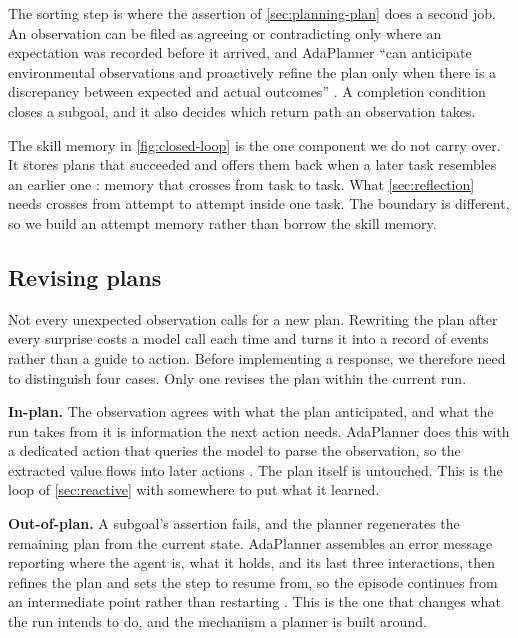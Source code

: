 The sorting step is where the assertion of \cref{sec:planning-plan} does a second job. An
observation can be filed as agreeing or contradicting only where an expectation was recorded before
it arrived, and AdaPlanner ``can anticipate environmental observations and proactively refine the
plan only when there is a discrepancy between expected and actual outcomes''
\citep[\S3]{sun2023adaplanner}. A completion condition closes a subgoal, and it also decides which
return path an observation takes.

The skill memory in \cref{fig:closed-loop} is the one component we do not carry over. It stores plans that
succeeded and offers them back when a later task resembles an earlier one
\citep[\S3.3]{sun2023adaplanner}: memory that crosses from task to task. What
\cref{sec:reflection} needs crosses from attempt to attempt inside one task. The boundary is
different, so we build an attempt memory rather than borrow the skill memory.

\subsection{Revising plans}
\label{sec:planning-revision}

Not every unexpected observation calls for a new plan. Rewriting the plan after every surprise
costs a model call each time and turns it into a record of events rather than a guide to action.
Before implementing a response, we therefore need to distinguish four cases. Only one revises
the plan within the current run.

\bi

\item \textbf{In-plan.} The observation agrees with what the plan anticipated, and what the run
takes from it is information the next action needs. AdaPlanner does this with a dedicated action
that queries the model to parse the observation, so the extracted value flows into later actions
\citep[\S3.2]{sun2023adaplanner}. The plan itself is untouched. This is the loop of
\cref{sec:reactive} with somewhere to put what it learned.

\item \textbf{Out-of-plan.} A subgoal's assertion fails, and the planner regenerates the remaining
plan from the current state. AdaPlanner assembles an error message reporting where the agent is,
what it holds, and its last three interactions, then refines the plan and sets the step to resume
from, so the episode continues from an intermediate point rather than restarting
\citep[\S3.2]{sun2023adaplanner}. This is the one that changes what the run intends to do, and the
mechanism a planner is built around.


